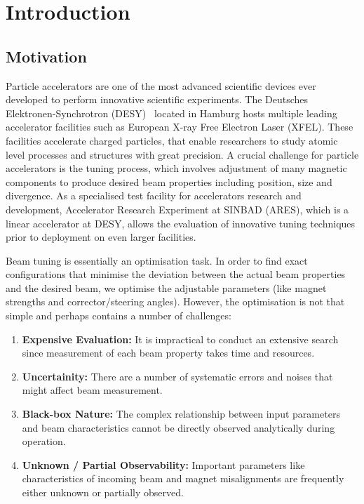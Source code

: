 \section{Introduction}\label{a:latex_en}

\subsection{Motivation}

Particle accelerators are one of the most advanced scientific devices ever developed 
to perform innovative scientific experiments. The Deutsches Elektronen-Synchrotron 
(DESY)~\cite{DESYwebsite} located in Hamburg hosts multiple leading accelerator facilities such as 
European X-ray Free Electron Laser (XFEL). These facilities accelerate charged particles, that enable researchers to study atomic level processes and structures with 
great precision. A crucial challenge for particle accelerators is the tuning process, which 
involves adjustment of many magnetic components to produce desired beam properties including 
position, size and divergence. As a specialised test facility for accelerators research and 
development, Accelerator Research Experiment at SINBAD (ARES), which is a linear accelerator at DESY,
allows the evaluation of innovative tuning techniques prior to deployment on even larger facilities. \

Beam tuning is essentially an optimisation task. In order to find exact configurations that minimise the 
deviation between the actual beam properties and the desired beam, we optimise the adjustable parameters 
(like magnet strengths and corrector/steering angles). However, the optimisation is not that simple and 
perhaps contains a number of challenges: 

\begin{enumerate}
    \item \textbf{Expensive Evaluation:} It is impractical to conduct an extensive search since measurement of each beam property takes time and resources.
    \item \textbf{Uncertainity:} There are a number of systematic errors and noises that might affect beam measurement.
    \item \textbf{Black-box Nature:} The complex relationship between input parameters and beam characteristics cannot be directly observed analytically during operation.
    \item \textbf{Unknown / Partial Observability:} Important parameters like characteristics of incoming beam and magnet misalignments are frequently either unknown or partially observed. 

\end{enumerate}

